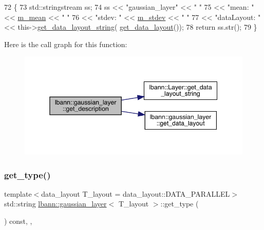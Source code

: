 \begin{DoxyCode}
72                                              \{
73     std::stringstream ss;
74     ss << \textcolor{stringliteral}{"gaussian\_layer"} << \textcolor{stringliteral}{"  "}
75        << \textcolor{stringliteral}{"mean: "} << \hyperlink{classlbann_1_1gaussian__layer_a397a47df5968e58fd1fcbfcdc2a3a620}{m\_mean} << \textcolor{stringliteral}{" "}
76        << \textcolor{stringliteral}{"stdev: "} << \hyperlink{classlbann_1_1gaussian__layer_a42dc22c72a46ed4538b7776e24eb0a40}{m\_stdev} << \textcolor{stringliteral}{" "}
77        << \textcolor{stringliteral}{"dataLayout: "} << this->\hyperlink{classlbann_1_1Layer_ae3f4a5602df821f4221614b1e3782dc1}{get\_data\_layout\_string}(
      \hyperlink{classlbann_1_1gaussian__layer_a79dce69c1a681b66849423329f84df30}{get\_data\_layout}());
78      \textcolor{keywordflow}{return} ss.str();
79   \}
\end{DoxyCode}
Here is the call graph for this function\+:\nopagebreak
\begin{figure}[H]
\begin{center}
\leavevmode
\includegraphics[width=345pt]{classlbann_1_1gaussian__layer_a0a062897d0660c9a494c98d800aac9e9_cgraph}
\end{center}
\end{figure}
\mbox{\label{classlbann_1_1gaussian__layer_a7c9082127b954a05359b6cac9f01122c}} 
\subsubsection{\texorpdfstring{get\+\_\+type()}{get\_type()}}
{\footnotesize\ttfamily template$<$data\+\_\+layout T\+\_\+layout = data\+\_\+layout\+::\+D\+A\+T\+A\+\_\+\+P\+A\+R\+A\+L\+L\+EL$>$ \\
std\+::string \hyperlink{classlbann_1_1gaussian__layer}{lbann\+::gaussian\+\_\+layer}$<$ T\+\_\+layout $>$\+::get\+\_\+type (\begin{DoxyParamCaption}{ }\end{DoxyParamCaption}) const\hspace{0.3cm}{\ttfamily [inline]}, {\ttfamily [override]}, {\ttfamily [virtual]}}

